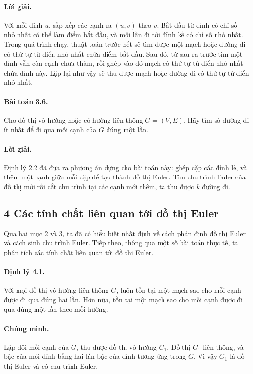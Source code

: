 \documentclass[11pt]{article}
\begin{document}
\paragraph{Lời giải.}
Với mỗi đỉnh \(u\), sắp xếp các cạnh ra \((u,v)\) theo \(v\). Bắt đầu từ đỉnh
có chỉ số nhỏ nhất có thể làm điểm bắt đầu, và mỗi lần đi tới đỉnh kề có chỉ số
nhỏ nhất. Trong quá trình chạy, thuật toán trước hết sẽ tìm được một mạch hoặc
đường đi có thứ tự từ điển nhỏ nhất chứa điểm bắt đầu. Sau đó, từ sau ra trước
tìm một đỉnh vẫn còn cạnh chưa thăm, rồi ghép vào đó mạch có thứ tự từ điển nhỏ
nhất chứa đỉnh này. Lặp lại như vậy sẽ thu được mạch hoặc đường đi có thứ tự từ
điển nhỏ nhất.

\paragraph{Bài toán 3.6.}
Cho đồ thị vô hướng hoặc có hướng liên thông \(G=(V,E)\). Hãy tìm số đường đi
ít nhất để đi qua mỗi cạnh của \(G\) đúng một lần.

\paragraph{Lời giải.}
Định lý 2.2 đã đưa ra phương án dựng cho bài toán này: ghép cặp các đỉnh lẻ, và
thêm một cạnh giữa mỗi cặp để tạo thành đồ thị Euler. Tìm chu trình Euler của
đồ thị mới rồi cắt chu trình tại các cạnh mới thêm, ta thu được \(k\) đường đi.

\subsection*{4 Các tính chất liên quan tới đồ thị Euler}

Qua hai mục 2 và 3, ta đã có hiểu biết nhất định về cách phán định đồ thị Euler
và cách sinh chu trình Euler. Tiếp theo, thông qua một số bài toán thực tế, ta
phân tích các tính chất liên quan tới đồ thị Euler.

\paragraph{Định lý 4.1.}
Với mọi đồ thị vô hướng liên thông \(G\), luôn tồn tại một mạch sao cho mỗi
cạnh được đi qua đúng hai lần. Hơn nữa, tồn tại một mạch sao cho mỗi cạnh được
đi qua đúng một lần theo mỗi hướng.

\paragraph{Chứng minh.}
Lặp đôi mỗi cạnh của \(G\), thu được đồ thị vô hướng \(G_1\). Đồ thị \(G_1\)
liên thông, và bậc của mỗi đỉnh bằng hai lần bậc của đỉnh tương ứng trong
\(G\). Vì vậy \(G_1\) là đồ thị Euler và có chu trình Euler.
\end{document}
